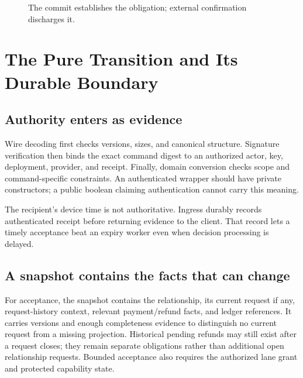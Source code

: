 \documentclass[11pt]{article}
\begin{document}
\begin{figure}[H]
\centering
{}
\caption{The commit establishes the obligation; external confirmation discharges it.}
\end{figure}

\section{The Pure Transition and Its Durable Boundary}

\subsection{Authority enters as evidence}

Wire decoding first checks versions, sizes, and canonical structure. Signature
verification then binds the exact command digest to an authorized actor, key,
deployment, provider, and receipt. Finally, domain conversion checks scope and
command-specific constraints. An authenticated wrapper should have private
constructors; a public boolean claiming authentication cannot carry this meaning.

The recipient's device time is not authoritative. Ingress durably records
authenticated receipt before returning evidence to the client. That record lets a
timely acceptance beat an expiry worker even when decision processing is delayed.

\subsection{A snapshot contains the facts that can change}

For acceptance, the snapshot contains the relationship, its current request if
any, request-history context, relevant payment/refund facts, and ledger references.
It carries versions and enough completeness evidence to distinguish no current
request from a missing projection. Historical pending refunds may still exist
after a request closes; they remain separate obligations rather than additional
open relationship requests.
Bounded acceptance also requires the authorized lane grant and protected capability state.
\end{document}
